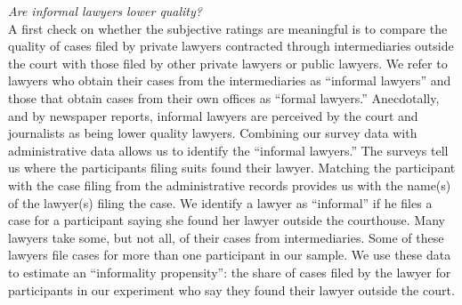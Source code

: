 \documentclass[12 pt]{article}
\begin{document}
\noindent\emph{Are informal lawyers lower quality?}\\
A first check on whether the subjective ratings are meaningful is to compare the quality of cases filed by private lawyers contracted through intermediaries outside the court with those filed by other private lawyers or public lawyers. We refer to lawyers who obtain their cases from the intermediaries as “informal lawyers” and those that obtain cases from their own offices as “formal lawyers.” Anecdotally, and by newspaper reports, informal lawyers are perceived by the court and journalists as being lower quality lawyers. Combining our survey data with administrative data allows us to identify the “informal lawyers.” The surveys tell us where the participants filing suits found their lawyer. Matching the participant with the case filing from the administrative records provides us with the name(s) of the lawyer(s) filing the case. We identify a lawyer as “informal” if he files a case for a participant saying she found her lawyer outside the courthouse. Many lawyers take some, but not all, of their cases from intermediaries. Some of these lawyers file cases for more than one participant in our sample. We use these data to estimate an “informality propensity”: the share of cases filed by the lawyer for participants in our experiment who say they found their lawyer outside the court. 
\end{document}
